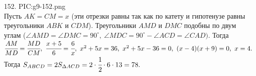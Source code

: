152. {{PIC:g9-152.png}}\\
Пусть $AK=CM=x$ (эти отрезки равны так как по катету и гипотенузе равны треугольники $ABK$ и $CDM$). Треугольники $AMD$ и $DMC$ подобны по двум  углам ($\angle AMD=\angle DMC=90^\circ,\ \angle MDC=90^\circ-\angle ACD=\angle CAD).$ Тогда $\cfrac{AM}{MD}=\cfrac{MD}{CM},\ \cfrac{x+5}{6}=\cfrac{6}{x},\ x^2+5x=36,\ x^2+5x-36=0,\
(x-4)(x+9)=0,\ x=4.$ Тогда $S_{ABCD}=2S_{\Delta ACD}=2\cdot\cfrac{1}{2}\cdot6\cdot13=78.$\\
